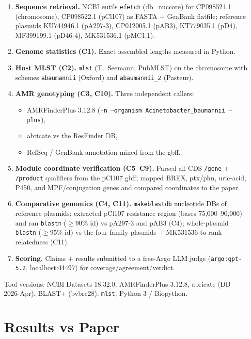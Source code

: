 \documentclass[11pt]{article}
\begin{document}
\begin{enumerate}
  \item \textbf{Sequence retrieval.} NCBI eutils \texttt{efetch} (db=nuccore) for CP098521.1 (chromosome), CP098522.1 (pCl107) as FASTA + GenBank flatfile; reference plasmids KU744946.1 (pA297-3), CP012005.1 (pAB3), KT779035.1 (pD4), MF399199.1 (pD46-4), MK531536.1 (pMC1.1).
  \item \textbf{Genome statistics (C1).} Exact assembled lengths measured in Python.
  \item \textbf{Host MLST (C2).} \texttt{mlst} (T.~Seemann; PubMLST) on the chromosome with schemes \texttt{abaumannii} (Oxford) and \texttt{abaumannii\_2} (Pasteur).
  \item \textbf{AMR genotyping (C3, C10).} Three independent callers:
    \begin{itemize}
      \item AMRFinderPlus 3.12.8 (\texttt{-n --organism Acinetobacter\_baumannii --plus}),
      \item abricate vs the ResFinder DB,
      \item RefSeq / GenBank annotation mined from the gbff.
    \end{itemize}
  \item \textbf{Module coordinate verification (C5--C9).} Parsed all CDS \texttt{/gene} + \texttt{/product} qualifiers from the pCl107 gbff; mapped BREX, ptx/phn, uric-acid, P450, and MPF/conjugation genes and compared coordinates to the paper.
  \item \textbf{Comparative genomics (C4, C11).} \texttt{makeblastdb} nucleotide DBs of reference plasmids; extracted pCl107 resistance region (bases 75{,}000--90{,}000) and ran \texttt{blastn} ($\geq$90\% id) vs pA297-3 and pAB3 (C4); whole-plasmid \texttt{blastn} ($\geq$95\% id) vs the four family plasmids + MK531536 to rank relatedness (C11).
  \item \textbf{Scoring.} Claims + results submitted to a free-Argo LLM judge (\texttt{argo:gpt-5.2}, localhost:44497) for coverage/agreement/verdict.
\end{enumerate}

Tool versions: NCBI Datasets 18.32.0, AMRFinderPlus 3.12.8, abricate (DB 2026-Apr), BLAST+ (bvbrc28), \texttt{mlst}, Python 3 / Biopython.

\section{Results vs Paper}
\end{document}
